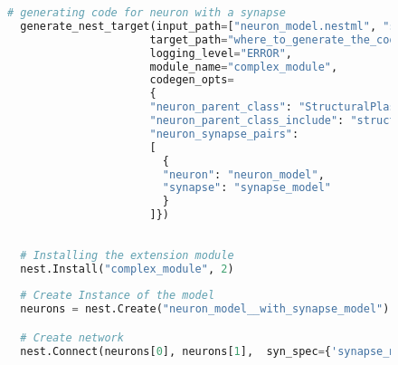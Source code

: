 \begin{figure}[ht!]
  \centering
  \begin{lstlisting}[language=Python, label=lst:nestml_with_synapse, caption={The \texttt{generate\_nest\_target} function generates code for the neuron and synapse together. The \texttt{input\_path} takes a list of nestml files with the first being the neuron model and the second the synapse model. Additionally, the library will be generated with the \emph{complex\_module} as the library name. In contrast to the first case, co-generating the code for the neuron and synapse together requires providing the \texttt{codegen\_opts} that is responsible for specifying the realtion between the neuron and the syanpse. Installing the new library is not different than the previous case, we simply call the \texttt{Install} function with the \emph{complex\_moduel} as the library name. The only difference now is creating instance of the neuron model. The neuron model is no longer registered in NEST under the same name as \emph{"neuron\_model}, but due to co-generating the neuron with the synapse, the neuron has more logic that handles its relation with the synapse model. The new name of the neuron is computed as the concatenation of its name with the synapse name, and it is available as \emph{neuron\_model\_\_with\_synapse\_model"}. The same happens to the synapse model and it is only available as \emph{synapse\_model\_\_with\_neuron\_model"}. This dependency forces the connection type in the network. Is the  \emph{synapse\_model\_\_with\_neuron\_model"} the synapse model involved in the connection, then the only valid postsynapse neuron model type is the \emph{neuron\_model\_\_with\_synapse\_model"}. Otherwise NEST will throw an exception and quit excuting the simulation script.}, captionpos=b]
  # generating code for neuron with a synapse
  generate_nest_target(input_path=["neuron_model.nestml", "synapse_model.nestml"],
                      target_path="where_to_generate_the_code",
                      logging_level="ERROR",
                      module_name="complex_module",
                      codegen_opts=
                      {
                      "neuron_parent_class": "StructuralPlasticityNode",
                      "neuron_parent_class_include": "structural_plasticity_node.h",
                      "neuron_synapse_pairs":
                      [
                        {
                        "neuron": "neuron_model",
                        "synapse": "synapse_model"
                        }
                      ]})
  
  
  # Installing the extension module
  nest.Install("complex_module", 2)
                                                            
  # Create Instance of the model
  neurons = nest.Create("neuron_model__with_synapse_model")

  # Create network
  nest.Connect(neurons[0], neurons[1],  syn_spec={'synapse_model': "synapse_model__with_neuron_model"})

  \end{lstlisting}
  \end{figure}


